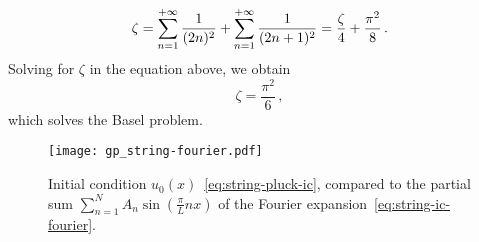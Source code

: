 \begin{equation}
  \zeta=\sum_{n=1}^{+\infty}\frac{1}{(2n)^2}+\sum_{n=1}^{+\infty}\frac{1}{(2n+1)^2}
  =\frac{\zeta}{4}+\frac{\pi^2}{8}\,.
\end{equation}
Solving for $\zeta$ in the equation above, we obtain
\begin{equation}
  \zeta=\frac{\pi^2}{6}\,,
\end{equation}
which solves the Basel problem.
\begin{figure}
  \centering
  \label{fig:string-fourier}
  \texttt{[image: gp\_string-fourier.pdf]}
  \caption{Initial condition $u_0(x)$~\cref{eq:string-pluck-ic}, compared to the partial
    sum $\sum_{n=1}^N A_n\sin(\frac{\pi}{L}nx)$ of the Fourier
  expansion~\cref{eq:string-ic-fourier}.}
\end{figure}

